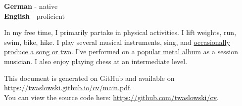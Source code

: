 \documentclass[9pt]{developercv} %
\begin{document}

\begin{minipage}[t]{0.3\textwidth}
	\vspace{-\baselineskip} %

	
	\textbf{German} - native\\
	\textbf{English} - proficient\\
\end{minipage}
\hfill
\begin{minipage}[t]{0.5\textwidth}
	\vspace{-\baselineskip} %
	
	
	In my free time, I primarily partake in physical activities. I lift weights, run, swim, bike, hike. I play several musical instruments, sing, and \textcolor{blue}{\href{https://open.spotify.com/artist/2M3v41tQLJG1nek13NGrow?si=o6iBdOBNQvqiQ5qq6Wze6A}{occasionally produce a song or two}}. I've performed on a \textcolor{blue}{\href{https://en.wikipedia.org/wiki/No_Grave_But_the_Sea}{popular metal album}} as a session musician.
    I also enjoy playing chess at an intermediate level.
\end{minipage}
\hfill
\vfill

\footnotesize{This document is generated on GitHub and available on \textcolor{blue}{\href{https://twaslowski.github.io/cv/main.pdf}{https://twaslowski.github.io/cv/main.pdf}}. \\
You can view the source code here: \textcolor{blue}{\href{https://github.com/twaslowski/cv}{https://github.com/twaslowski/cv}}.}

\end{document}
